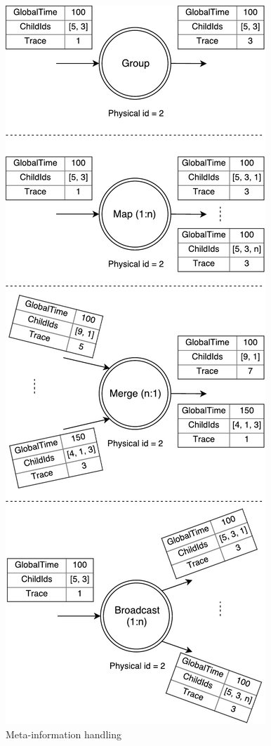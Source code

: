 \begin{figure}[htbp]
  \centering
  \includegraphics[scale=0.5]{pics/operations}
  \caption{Meta-information handling}
  \label {logical-graph-ops-figure}
\end{figure}

